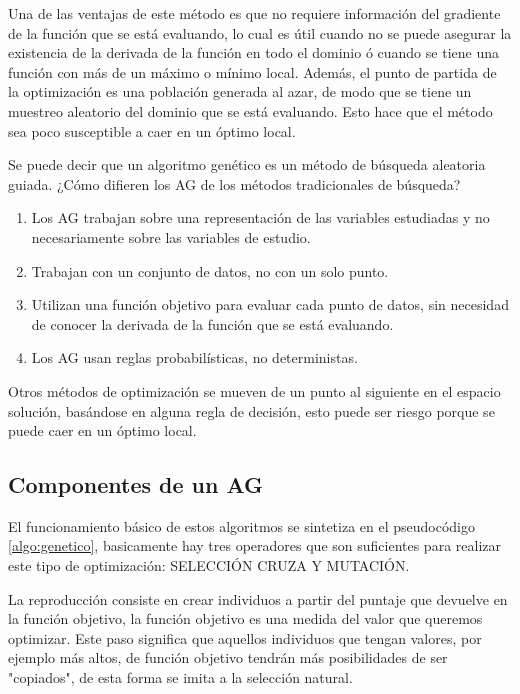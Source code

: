 Una de las ventajas de este método es que no requiere información del gradiente
de la función que se está evaluando, lo cual es útil cuando no se puede asegurar
la existencia de la derivada de la función en todo el dominio ó cuando se tiene
una función con más de un máximo o mínimo local.
%
Además, el punto de partida de la optimización es una población generada al
azar, de modo que se tiene un muestreo aleatorio del dominio que se está
evaluando.
%
Esto hace que el método sea poco susceptible a caer en un óptimo local.

Se puede decir que un algoritmo genético es un método de búsqueda aleatoria
guiada.
%
¿Cómo difieren los AG de los métodos tradicionales de búsqueda?
%
\begin{enumerate}
  \item Los AG trabajan sobre una representación de las variables estudiadas y
    no necesariamente sobre las variables de estudio.
    \item Trabajan con un conjunto de datos, no con un solo punto.
    \item Utilizan una función objetivo para evaluar cada punto de datos, sin
      necesidad de conocer la derivada de la función que se está evaluando.
    \item Los AG usan reglas probabilísticas, no deterministas.
\end{enumerate}

Otros métodos de optimización se mueven de un punto al siguiente en el espacio
solución, basándose en alguna regla de decisión, esto puede ser riesgo porque se
puede caer en un óptimo local.
%

\subsection{Componentes de un AG}
%
El funcionamiento básico de estos algoritmos se sintetiza en el pseudocódigo
\ref{algo:genetico}, basicamente hay tres operadores que son suficientes para
realizar este tipo de optimización: SELECCIÓN CRUZA Y MUTACIÓN.


La reproducción consiste en crear individuos a partir del puntaje que devuelve
en la función objetivo, la función objetivo es una medida del valor que
queremos optimizar.
%
Este paso significa que aquellos individuos que tengan valores, por ejemplo más
altos, de función objetivo tendrán más posibilidades de ser "copiados", de esta
forma se imita a la selección natural.

